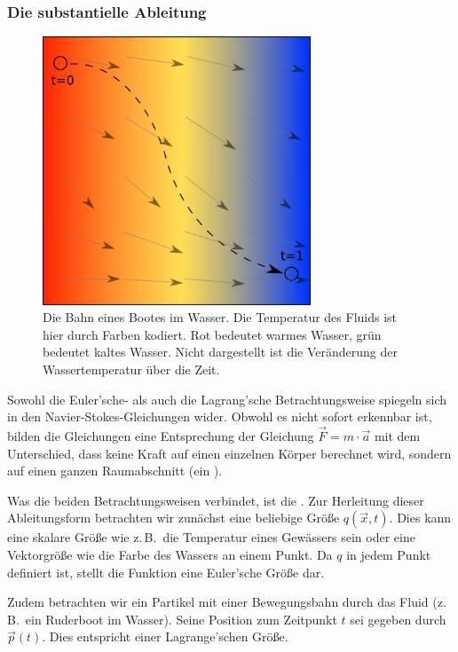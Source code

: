 \subsubsection{Die substantielle Ableitung}

\begin{figure}[ht]
\centering
\includegraphics[width=8cm]{images/swimmer_in_water}
\caption{Die Bahn eines Bootes im Wasser. Die Temperatur des Fluids ist hier durch Farben kodiert. Rot bedeutet warmes Wasser, grün bedeutet kaltes Wasser. Nicht dargestellt ist die Veränderung der Wassertemperatur über die Zeit.}
\end{figure}

Sowohl die Euler'sche- als auch die Lagrang'sche Betrachtungsweise spiegeln sich
in den Navier-Stokes-Gleichungen wider. Obwohl es nicht sofort
erkennbar ist, bilden die Gleichungen eine Entsprechung der Gleichung
$\vec{F} = m \cdot \vec{a}$ mit dem Unterschied, dass keine Kraft auf
einen einzelnen Körper berechnet wird, sondern auf einen ganzen
Raumabschnitt (ein ).

Was die beiden Betrachtungsweisen verbindet, ist die
. Zur Herleitung dieser
Ableitungsform betrachten wir zunächst eine beliebige Größe
$q(\vec{x},t)$. Dies kann eine skalare Größe wie z.\,B.\ die Temperatur
eines Gewässers sein oder eine Vektorgröße wie die Farbe des Wassers
an einem Punkt. Da $q$ in jedem Punkt definiert ist, stellt die
Funktion eine Euler'sche Größe dar.

Zudem betrachten wir ein Partikel mit einer Bewegungsbahn durch das
Fluid (z.\,B.\  ein Ruderboot im Wasser). Seine Position zum Zeitpunkt
$t$ sei gegeben durch $\vec{p}(t)$. Dies entspricht einer
Lagrange'schen Größe.

